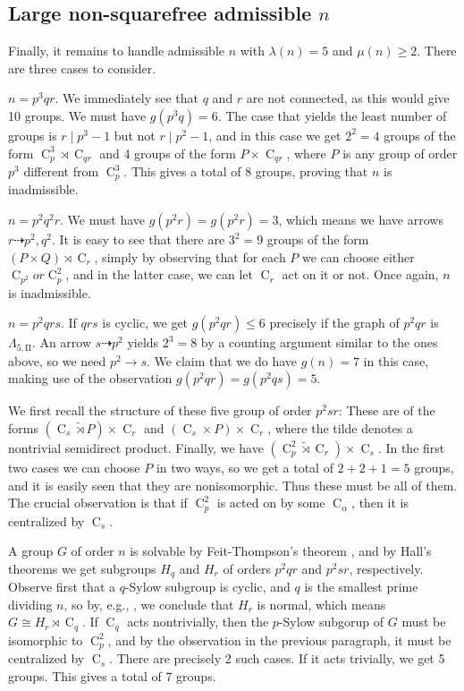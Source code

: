 \documentclass{article}
\newcommand{\cyc}[1]{\operatorname{C}_{#1}}
\newcommand{\qlamz}{\Lambda_{5,\text{II}}}
\theoremstyle{plain}
\theoremstyle{definition}
\begin{document}
\subsection{Large non-squarefree admissible $n$} 
Finally, it remains to handle admissible $n$ with $\lambda(n) = 5$ and $\mu(n) \ge 2$. There are three cases to consider.

 $n = p^3 q r$.
We immediately see that $q$ and $r$ are not connected, as this would give 10 groups. We must have $g(p^3 q) = 6$. The case that yields the least number of groups is $r \mid p^3 - 1$ but not $r \mid p^2 - 1$, and in this case we get $2^2 = 4$ groups of the form $\cyc{p}^3 \rtimes \cyc{qr}$ and 4 groups of the form $P \times \cyc{qr}$, where $P$ is any group of order $p^3$ different from $\cyc{p}^3$. This gives a total of 8 groups, proving that $n$ is inadmissible.

 $n = p^2 q^2 r$.
We must have $g(p^2 r) = g(p^2 r) = 3$, which means we have arrows $r \dashrightarrow p^2, q^2$. It is easy to see that there are $3^2 = 9$ groups of the form $(P \times Q) \rtimes \cyc{r}$, simply by observing that for each $P$ we can choose either $\cyc{p^2} or \cyc{p}^2$, and in the latter case, we can let $\cyc{r}$ act on it or not. Once again, $n$ is inadmissible.
 
 $n = p^2 q r s$.
If $qrs$ is cyclic, we get $g(p^2 q r) \le 6$ precisely if the graph of $p^2 q r$ is $\qlamz$. An arrow $s \dashrightarrow p^2$ yields $2^3 = 8$ by a counting argument similar to the ones above, so we need $p^2 \rightarrow s$. We claim that we do have $g(n) = 7$ in this case, making use of the observation $g(p^2 q r) = g(p^2 q s) = 5$.

We first recall the structure of these five group of order $p^2 s r$: These are of the forms $(\cyc{s} \tilde{\rtimes} P) \times \cyc{r}$ and $(\cyc{s} \times P) \times \cyc{r}$, where the tilde denotes a nontrivial semidirect product. Finally, we have $(\cyc{p}^2 \tilde{\rtimes} \cyc{r}) \times \cyc{s}$. In the first two cases we can choose $P$ in two ways, so we get a total of $2 + 2 + 1 = 5$ groups, and it is easily seen that they are nonisomorphic. Thus these must be all of them. The crucial observation is that if $\cyc{p}^2$ is acted on by some $\cyc{\alpha}$, then it is centralized by $\cyc{s}$.

A group $G$ of order $n$ is solvable by Feit-Thompson's theorem {\cite{oddsolve}}, and by Hall's theorems {\cite[Th.~3.13]{fgt}} we get subgroups $H_q$ and $H_r$ of orders $p^2 q r$ and $p^2 s r$, respectively. Observe first that a $q$-Sylow subgroup is cyclic, and $q$ is the smallest prime dividing $n$, so by, e.g., {\cite[Th.~5.14]{fgt}}, we conclude that $H_r$ is normal, which means $G \cong H_r \rtimes \cyc{q}$. If $\cyc{q}$ acts nontrivially, then the $p$-Sylow subgorup of $G$ must be isomorphic to $\cyc{p}^2$, and by the observation in the previous paragraph, it must be centralized by $\cyc{s}$. There are precisely 2 such cases. If it acts trivially, we get 5 groups. This gives a total of 7 groups.
\end{document}
